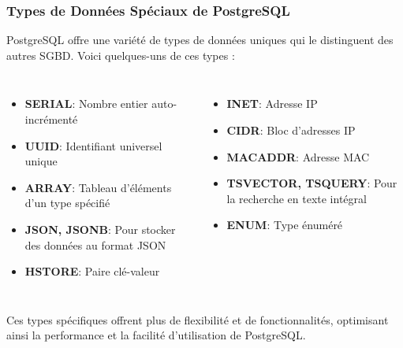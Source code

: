 \begin{frame}
  \frametitle{Types de Données Spéciaux de PostgreSQL}

  PostgreSQL offre une variété de types de données uniques qui le distinguent des autres SGBD. Voici quelques-uns de ces types :

  \begin{columns}
    \begin{itemize}
      \item \textbf{SERIAL}: Nombre entier auto-incrémenté
      \item \textbf{UUID}: Identifiant universel unique
      \item \textbf{ARRAY}: Tableau d'éléments d'un type spécifié
      \item \textbf{JSON, JSONB}: Pour stocker des données au format JSON
      \item \textbf{HSTORE}: Paire clé-valeur
    \end{itemize}

    \begin{itemize}
      \item \textbf{INET}: Adresse IP
      \item \textbf{CIDR}: Bloc d'adresses IP
      \item \textbf{MACADDR}: Adresse MAC
      \item \textbf{TSVECTOR, TSQUERY}: Pour la recherche en texte intégral
      \item \textbf{ENUM}: Type énuméré
    \end{itemize}
  \end{columns}

  \vspace{0.5cm}
  Ces types spécifiques offrent plus de flexibilité et de fonctionnalités, optimisant ainsi la performance et la facilité d'utilisation de PostgreSQL.

\end{frame}

